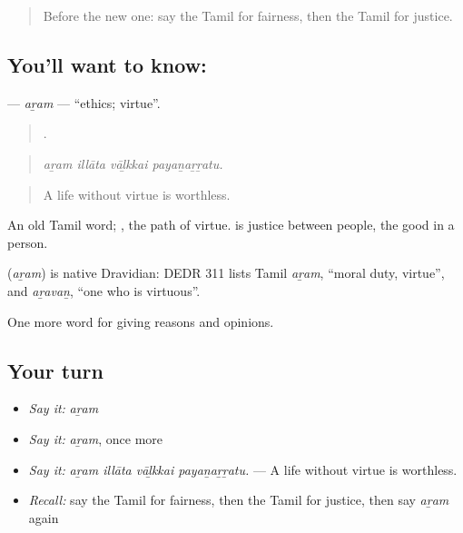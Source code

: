 \label{lesson:TA-C360-aram}



\begin{quote}
Before the new one: say the Tamil for fairness, then the Tamil for justice.
\end{quote}

\subsection*{You'll want to know: }
\textbf{} — \emph{aṟam} — \textquotedblleft{}ethics; virtue\textquotedblright{}.

\begin{quote}
   .
\end{quote}

\begin{quote}
\emph{aṟam illāta vāḻkkai payaṉaṟṟatu.}
\end{quote}

\begin{quote}
A life without virtue is worthless.
\end{quote}

An old Tamil word; , the path of virtue.  is justice between people,  the good in a person.

\begin{cousinweb}
\textbf{} (\emph{aṟam}) is native Dravidian: DEDR 311 lists Tamil \emph{aṟam}, \textquotedblleft{}moral duty, virtue\textquotedblright{}, and \emph{aṟavaṉ}, \textquotedblleft{}one who is virtuous\textquotedblright{}.
\end{cousinweb}

\begin{grammarlens}[title={What you've built}]
One more word for giving reasons and opinions.
\end{grammarlens}

\subsection*{Your turn}
\begin{itemize}
\raggedright
  \item \emph{Say it:} \emph{aṟam}
  \item \emph{Say it:} \emph{aṟam}, once more
  \item \emph{Say it:} \emph{aṟam illāta vāḻkkai payaṉaṟṟatu.} — A life without virtue is worthless.
  \item \emph{Recall:} say the Tamil for fairness, then the Tamil for justice, then say \emph{aṟam} again
\end{itemize}

